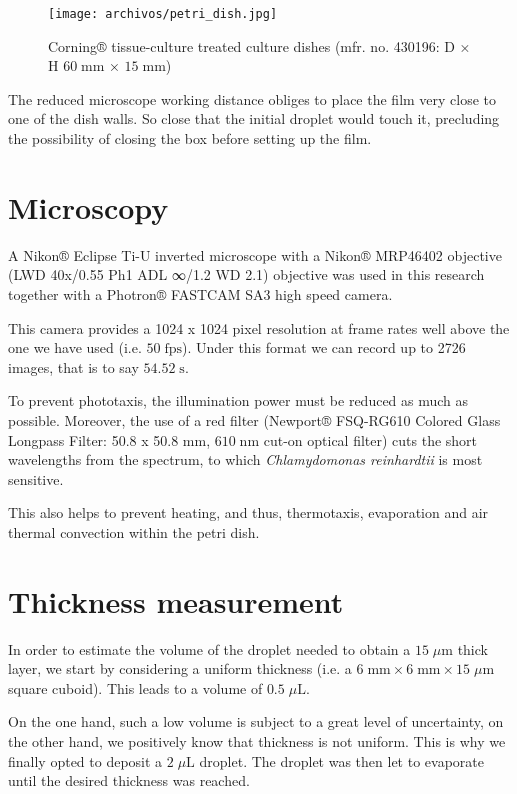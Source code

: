 \begin{figure}[H]
	\centering
	\texttt{[image: archivos/petri\_dish.jpg]}
	\caption{Corning® tissue-culture treated culture dishes (mfr. no. 430196: D × H $60 \; \textrm{mm}$ × $15 \; \textrm{mm}$)}
	\label{petri_dish}
\end{figure}

The reduced microscope working distance obliges to place the film very close to one of the dish walls. So close that the initial droplet would touch it, precluding the possibility of closing the box before setting up the film.

\section{Microscopy}
\label{mm_microscope}

A Nikon® Eclipse Ti-U inverted microscope with a Nikon® MRP46402 objective (LWD 40x/0.55 Ph1 ADL ∞/1.2 WD 2.1) objective was used in this research together with a Photron® FASTCAM SA3 high speed camera.

This camera provides a 1024 x 1024 pixel resolution at frame rates well above the one we have used (i.e. $50  \; \textrm{fps}$). Under this format we can record up to 2726 images, that is to say $54.52 \; \textrm{s}$.

To prevent phototaxis, the illumination power must be reduced as much as possible. Moreover, the use of a red filter (Newport® FSQ-RG610 Colored Glass Longpass Filter: 50.8 x 50.8 $\textrm{mm}$, $610 \; \textrm{nm}$ cut-on optical filter) cuts the short wavelengths from the spectrum, to which \textit{Chlamydomonas reinhardtii} is most sensitive.

This also helps to prevent heating, and thus, thermotaxis, evaporation and air thermal convection within the petri dish.

\section{Thickness measurement}
\label{mm_thickness}

In order to estimate the volume of the droplet needed to obtain a $15  \; \mu \textrm{m}$ thick layer, we start by considering a uniform thickness (i.e. a $6 \; \textrm{mm} \times 6  \; \textrm{mm} \times 15 \; \mu \textrm{m}$ square cuboid). This leads to a volume of $0.5 \; \mu \textrm{L}$.

On the one hand, such a low volume is subject to a great level of uncertainty, on the other hand, we positively know that thickness is not uniform. This is why we finally opted to deposit a $ 2 \; \mu \textrm{L} $ droplet. The droplet was then let to evaporate until the desired thickness was reached. 

